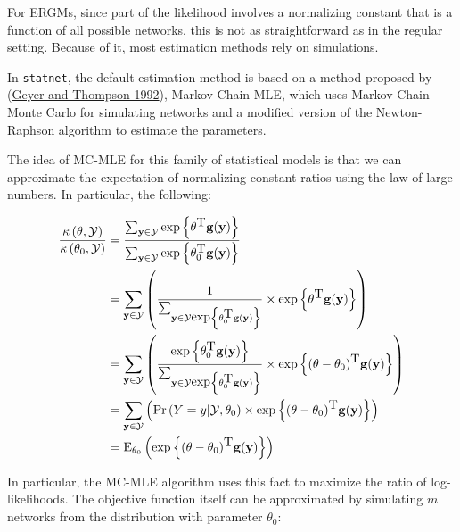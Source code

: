 \documentclass[
]{book}
\begin{document}
For ERGMs, since part of the likelihood involves a normalizing constant that is a function of all possible networks, this is not as straightforward as in the regular setting. Because of it, most estimation methods rely on simulations.

In \texttt{statnet}, the default estimation method is based on a method proposed by (\protect\hyperlink{ref-Geyer1992}{Geyer and Thompson 1992}), Markov-Chain MLE, which uses Markov-Chain Monte Carlo for simulating networks and a modified version of the Newton-Raphson algorithm to estimate the parameters.

The idea of MC-MLE for this family of statistical models is that we can approximate the expectation of normalizing constant ratios using the law of large numbers. In particular, the following:

\begin{align*}
\frac{\kappa\left(\theta,\mathcal{Y}\right)}{\kappa\left(\theta_0,\mathcal{Y}\right)} & = 
  \frac{
    \sum_{\mathbf{y}\in\mathcal{Y}}\mbox{exp}\left\{\theta^{\mbox{T}}\mathbf{g}(\mathbf{y})\right\}}{ 
    \sum_{\mathbf{y}\in\mathcal{Y}}\mbox{exp}\left\{\theta_0^{\mbox{T}}\mathbf{g}(\mathbf{y})\right\} 
  } \\
& = \sum_{\mathbf{y}\in\mathcal{Y}}\left( %
  \frac{1}{%
    \sum_{\mathbf{y}\in\mathcal{Y}\mbox{exp}\left\{\theta_0^{\mbox{T}}\mathbf{g}(\mathbf{y})\right\}}%
  } \times %
  \mbox{exp}\left\{\theta^{\mbox{T}}\mathbf{g}(\mathbf{y})\right\} %
  \right) \\
& = \sum_{\mathbf{y}\in\mathcal{Y}}\left( %
  \frac{\mbox{exp}\left\{\theta_0^{\mbox{T}}\mathbf{g}(\mathbf{y})\right\}}{%
    \sum_{\mathbf{y}\in\mathcal{Y}\mbox{exp}\left\{\theta_0^{\mbox{T}}\mathbf{g}(\mathbf{y})\right\}}%
  } \times %
  \mbox{exp}\left\{(\theta - \theta_0)^{\mbox{T}}\mathbf{g}(\mathbf{y})\right\} %
  \right) \\
& = \sum_{\mathbf{y}\in\mathcal{Y}}\left( %
  \mbox{Pr}\left(Y = y|\mathcal{Y}, \theta_0\right) \times %
  \mbox{exp}\left\{(\theta - \theta_0)^{\mbox{T}}\mathbf{g}(\mathbf{y})\right\} %
  \right) \\
& = \mbox{E}_{\theta_0}\left(\mbox{exp}\left\{(\theta - \theta_0)^{\mbox{T}}\mathbf{g}(\mathbf{y})\right\} \right)
\end{align*}

In particular, the MC-MLE algorithm uses this fact to maximize the ratio of log-likelihoods. The objective function itself can be approximated by simulating \(m\) networks from the distribution with parameter \(\theta_0\):
\end{document}
